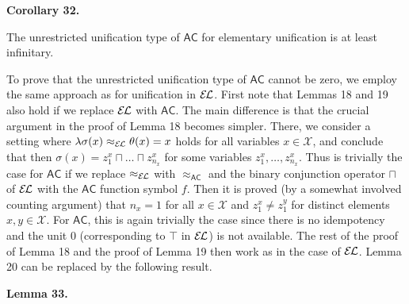  
 
\par\medskip\noindent\textbf{Corollary 32.}\par
 
 
The unrestricted unification type of $\mathsf{AC}$ for elementary unification is at least infinitary.\par
 
 
 
 
To prove that the unrestricted unification type of $\mathsf{AC}$ cannot be zero, we employ the same approach as for unification in $\mathcal{E\mkern-1.618muL}$. First note that Lemmas 18 and 19 also hold if we replace $\mathcal{E\mkern-1.618muL}$ with $\mathsf{AC}$. The main difference is that the crucial argument in the proof of Lemma 18 becomes simpler. There, we consider a setting where $\lambda\sigma(x)\approx_{\mathcal{E\mkern-1.618muL}}\theta(x)=x$ holds for all variables $x\in\mathcal{X}$, and conclude that then $\sigma(x)=z_{1}^{x}\sqcap\ldots\sqcap z_{n_{x}}^{x}$ for some variables $z_{1}^{x},\ldots,z_{n_{x}}^{x}$. Thus is trivially the case for $\mathsf{AC}$ if we replace $\approx_{\mathcal{E\mkern-1.618muL}}$ with $\approx_{\mathsf{AC}}$ and the binary conjunction operator $\sqcap$ of $\mathcal{E\mkern-1.618muL}$ with the $\mathsf{AC}$ function symbol $f$. Then it is proved (by a somewhat involved counting argument) that $n_{x}=1$ for all $x\in\mathcal{X}$ and $z_{1}^{x}\neq z_{1}^{y}$ for distinct elements $x,y\in\mathcal{X}$. For $\mathsf{AC}$, this is again trivially the case since there is no idempotency and the unit $0$ (corresponding to $\top$ in $\mathcal{E\mkern-1.618muL}$) is not available. The rest of the proof of Lemma 18 and the proof of Lemma 19 then work as in the case of $\mathcal{E\mkern-1.618muL}$. Lemma 20 can be replaced by the following result.\par
 
 
 
\par\medskip\noindent\textbf{Lemma 33.}\par
 
 
